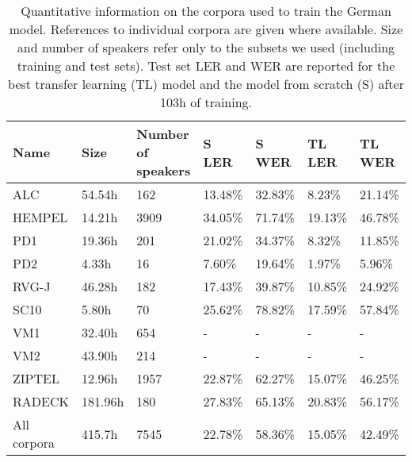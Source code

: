 \documentclass[11pt,a4paper]{article}
\begin{document}
\begin{table*}
\centering
{\footnotesize
\begin{tabularx}{\textwidth}{l l l l l l l}
\toprule
Name & Size & Number of speakers & S LER & S WER & TL LER & TL WER \\
\midrule
ALC \cite{schiel_alc_2012} & 54.54h & 162 & 13.48\% & 32.83\% & 8.23\% & 21.14\% \\
HEMPEL \cite{draxler_three-bas-corpora_2002} & 14.21h & 3909 & 34.05\% & 71.74\% & 19.13\% & 46.78\% \\
PD1 & 19.36h & 201 & 21.02\% & 34.37\% & 8.32\% & 11.85\% \\
PD2 & 4.33h & 16 & 7.60\% & 19.64\% & 1.97\% & 5.96\% \\
RVG-J \cite{draxler_three-bas-corpora_2002} & 46.28h & 182 & 17.43\% & 39.87\% & 10.85\% & 24.92\% \\
SC10 & 5.80h & 70 & 25.62\% & 78.82\% & 17.59\% & 57.84\% \\
VM1 \cite{wahlster_verbmobil_1993} & 32.40h & 654 & - & - & - & - \\
VM2 \cite{wahlster_verbmobil_1993} & 43.90h & 214 & - & - & - & - \\
ZIPTEL \cite{draxler_three-bas-corpora_2002} & 12.96h & 1957 & 22.87\% & 62.27\% & 15.07\% & 46.25\% \\
RADECK \cite{radeck_corpus_2015} & 181.96h & 180 & 27.83\% & 65.13\% & 20.83\% & 56.17\% \\
\midrule
All corpora & 415.7h & 7545 & 22.78\% & 58.36\% & 15.05\% & 42.49\% \\
\bottomrule
\end{tabularx}
}
\caption{Quantitative information on the corpora used to train the German model.
References to individual corpora are given where available.
Size and number of speakers refer only to the subsets we used (including training and test sets).
Test set \ac{LER} and \ac{WER} are reported for the best transfer learning (TL) model and the model from scratch (S) after 103h of training.}
\label{table_corpora_quantitative}
\end{table*}
\end{document}
